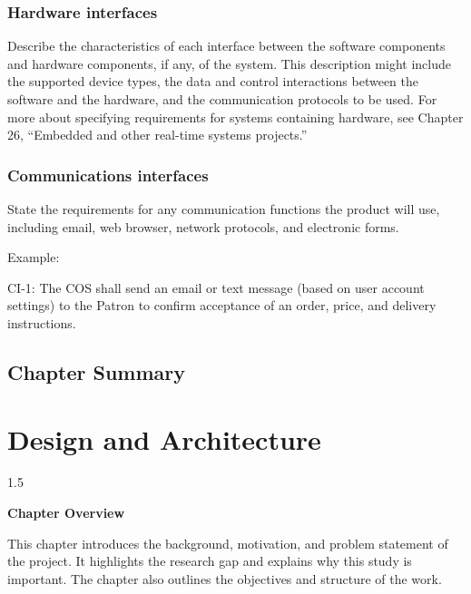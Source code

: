 \documentclass[A4paper,12pt]{report}
\theoremstyle{plain}
\theoremstyle{definition}
\theoremstyle{remark}
\numberwithin{equation}{section}
\begin{document}
\subsection{Hardware interfaces}
Describe the characteristics of each interface between the software components and hardware components, if any, of the system. This description might include the supported device types, the data and control interactions between the software and the hardware, and the communication protocols to be used. For more about specifying requirements for systems containing hardware, see Chapter 26, “Embedded and other real-time systems projects.”

\subsection{Communications interfaces}
State the requirements for any communication functions the product will use, including email, web browser, network protocols, and electronic forms.

Example:

CI-1:	The COS shall send an email or text message (based on user account settings) to the Patron to confirm acceptance of an order, price, and delivery instructions.





\section{Chapter Summary}


\chapter{Design and Architecture
}
\thispagestyle{empty}
\newpage
\begin{spacing}{1.5}

\thispagestyle{empty}

{\centering \Large \bfseries Chapter Overview \par}
\vspace{1cm} %

This chapter introduces the background, motivation, and problem
statement of the project. It highlights the research gap and explains
why this study is important. The chapter also outlines the objectives
and structure of the work.

\end{spacing}
\end{document}
